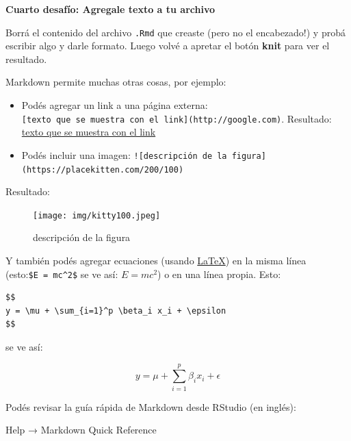 \documentclass[
  letterpaper,
  DIV=11,
  numbers=noendperiod]{scrartcl}
\begin{document}
\begin{tcolorbox}[enhanced jigsaw, arc=.35mm, title=\textcolor{quarto-callout-tip-color}{\faLightbulb}\hspace{0.5em}{Ejercicio}, coltitle=black, bottomrule=.15mm, breakable, colbacktitle=quarto-callout-tip-color!10!white, bottomtitle=1mm, opacityback=0, toptitle=1mm, left=2mm, opacitybacktitle=0.6, rightrule=.15mm, toprule=.15mm, colback=white, colframe=quarto-callout-tip-color-frame, leftrule=.75mm, titlerule=0mm]
\textbf{Cuarto desafío: Agregale texto a tu archivo}

Borrá el contenido del archivo \texttt{.Rmd} que creaste (pero no el
encabezado!) y probá escribir algo y darle formato. Luego volvé a
apretar el botón \textbf{knit} para ver el resultado.
\end{tcolorbox}

Markdown permite muchas otras cosas, por ejemplo:

\begin{itemize}
\item
  Podés agregar un link a una página externa:
  \texttt{{[}texto\ que\ se\ muestra\ con\ el\ link{]}(http://google.com)}.
  Resultado: \href{http://google.com}{texto que se muestra con el link}
\item
  Podés incluir una imagen:
  \texttt{!{[}descripción\ de\ la\ figura{]}(https://placekitten.com/200/100)}
\end{itemize}

Resultado:

\begin{figure}

{\centering \texttt{[image: img/kitty100.jpeg]}

}

\caption{descripción de la figura}

\end{figure}

Y también podés agregar ecuaciones (usando
\href{https://es.wikipedia.org/wiki/LaTeX}{LaTeX}) en la misma línea
(esto:\texttt{\$E\ =\ mc\^{}2\$} se ve así: \(E = mc^2\)) o en una línea
propia. Esto:

\begin{verbatim}
$$
y = \mu + \sum_{i=1}^p \beta_i x_i + \epsilon
$$
\end{verbatim}

se ve así:

\[
y = \mu + \sum_{i=1}^p \beta_i x_i + \epsilon
\]

\begin{tcolorbox}[enhanced jigsaw, arc=.35mm, title=\textcolor{quarto-callout-note-color}{\faInfo}\hspace{0.5em}{Información}, coltitle=black, bottomrule=.15mm, breakable, colbacktitle=quarto-callout-note-color!10!white, bottomtitle=1mm, opacityback=0, toptitle=1mm, left=2mm, opacitybacktitle=0.6, rightrule=.15mm, toprule=.15mm, colback=white, colframe=quarto-callout-note-color-frame, leftrule=.75mm, titlerule=0mm]
Podés revisar la guía rápida de Markdown desde RStudio (en inglés):

Help → Markdown Quick Reference
\end{tcolorbox}
\end{document}
